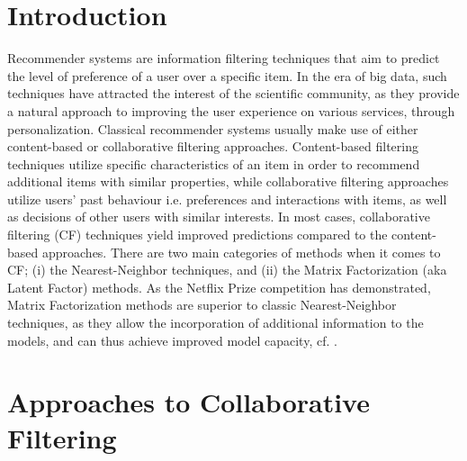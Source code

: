 \section*{Introduction}
Recommender systems are information filtering techniques that aim to predict the level of preference of a user over a specific item. In the era of big data, such techniques have attracted the interest of the scientific community, as they provide a natural approach to improving the user experience on various services, through personalization.
Classical recommender systems usually make use of either content-based or collaborative filtering approaches. Content-based filtering techniques utilize specific characteristics of an item in order to recommend additional items with similar properties, while collaborative filtering approaches utilize users' past behaviour i.e. preferences and interactions with items, as well as decisions of other users with similar interests. In most cases, collaborative filtering (CF) techniques yield improved predictions compared to the content-based approaches.
There are two main categories of methods when it comes to CF; (i) the Nearest-Neighbor techniques, and (ii) the Matrix Factorization (aka Latent Factor) methods.
As the Netflix Prize competition has demonstrated, Matrix Factorization methods are superior to classic Nearest-Neighbor techniques, as they allow the incorporation of additional information to the models, and can thus achieve improved model capacity, cf. \cite{koren2009matrix}.

\section*{Approaches to Collaborative Filtering}

